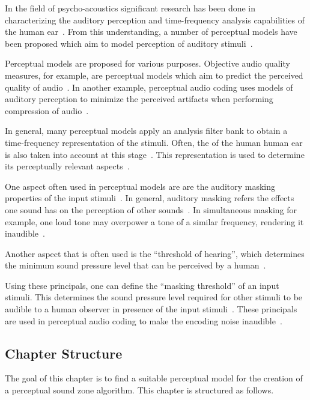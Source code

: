In the field of psycho-acoustics significant research has been done in characterizing the auditory perception and time-frequency
analysis capabilities of the human ear~\cite{painter2000perceptual}.
From this understanding, a number of perceptual models have been proposed which aim to model perception of auditory stimuli~\cite{van2005perceptual}.

Perceptual models are proposed for various purposes.
Objective audio quality measures, for example, are perceptual models which aim to predict the perceived quality of audio~\cite{torcoli2021objective}.
In another example, perceptual audio coding uses models of auditory perception to minimize the perceived artifacts when 
performing compression of audio~\cite{herre2019psychoacoustic}.

In general, many perceptual models apply an analysis filter bank to obtain a time-frequency representation of the stimuli.
Often, the of the human human ear is also taken into account at this stage~\cite{van2005perceptual, taal2012low}.
This representation is used to determine its perceptually relevant aspects~\cite{herre2019psychoacoustic}.

One aspect often used in perceptual models are are the auditory masking properties of the input stimuli~\cite{herre2019psychoacoustic}.
In general, auditory masking refers the effects one sound has on the perception of other sounds~\cite{painter2000perceptual}.
In simultaneous masking for example, one loud tone may overpower a tone of a similar frequency, rendering it inaudible~\cite{painter2000perceptual}.

Another aspect that is often used is the ``threshold of hearing'', which determines the minimum sound pressure level 
that can be perceived by a human~\cite{herre2019psychoacoustic}.

Using these principals, one can define the ``masking threshold'' of an input stimuli.
This determines the sound pressure level required for other stimuli to be audible to a human observer in presence 
of the input stimuli~\cite{painter2000perceptual}. 
These principals are used in perceptual audio coding to make the encoding noise inaudible~\cite{herre2019psychoacoustic}.

\subsection*{Chapter Structure}
The goal of this chapter is to find a suitable perceptual model for the creation of a perceptual sound zone algorithm.
This chapter is structured as follows.

